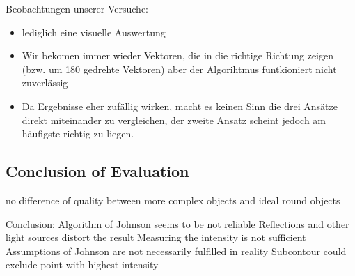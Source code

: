 Beobachtungen unserer Versuche:\\
\begin{itemize}
	\item lediglich eine visuelle Auswertung
	\item Wir bekomen immer wieder Vektoren, die in die richtige Richtung zeigen  (bzw. um 180 gedrehte Vektoren) aber der Algorihtmus funtkioniert nicht zuverlässig
	\item Da Ergebnisse eher zufällig wirken, macht es keinen Sinn die drei Ansätze direkt miteinander zu vergleichen, der zweite Ansatz scheint jedoch am häufigste richtig zu liegen.
\end{itemize}

\subsection{Conclusion of Evaluation}







no difference of quality between more complex objects 
and ideal round objects

Conclusion: 
Algorithm of Johnson seems to be not reliable
Reflections and other light sources distort the result
Measuring the intensity is not sufficient
Assumptions of Johnson are not necessarily fulfilled in reality
Subcontour could exclude point with highest intensity



\newpage